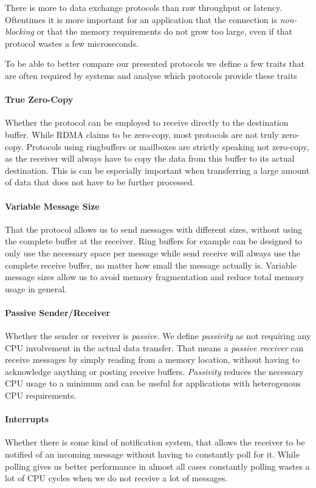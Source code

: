 There is more to data exchange protocols than raw throughput or latency. Oftentimes it is more important for an application
that the connection is \emph{non-blocking} or that the memory requirements do not grow too large, even if that protocol wastes
a few microseconds.

To be able to better compare our presented protocols we define a few traits that are often required by systems and
analyse which protocols provide these traits

\paragraph{True Zero-Copy} Whether the protocol can be employed to receive directly to the destination buffer. While RDMA 
claims to be zero-copy, most protocols are not truly zero-copy. Protocols using ringbuffers or mailboxes are
strictly speaking not zero-copy, as the receiver will always have to copy the data from this buffer to its actual destination.
This is can be especially important when transferring a large amount of data that does not have to be further processed.

\paragraph{Variable Message Size} That the protocol allows us to send messages with different sizes, without using the 
complete buffer at the receiver. Ring buffers for example can be designed to only use the necessary space per message
while send receive will always use the complete receive buffer, no matter how small the message actually is. Variable
message sizes allow us to avoid memory fragmentation and reduce total memory usage in general.

\paragraph{Passive Sender/Receiver} Whether the sender or receiver is \emph{passive}. We define \emph{passivity} as not 
requiring any CPU involvement in the actual data transfer. That means a \emph{passive receiver} can receive messages by
simply reading from a memory location, without having to acknowledge anything or posting receive buffers. \emph{Passivity} 
reduces the necessary CPU usage to a minimum and can be useful for applications with heterogenous CPU requirements.

\paragraph{Interrupts} Whether there is some kind of notification system, that allows the receiver to be notified 
of an incoming message without having to constantly poll for it. While polling gives us better performance in almost all cases
constantly polling wastes a lot of CPU cycles when we do not receive a lot of messages.

